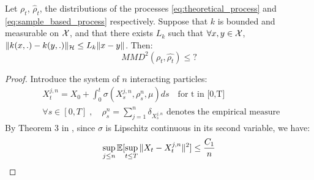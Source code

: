 \begin{proposition} Let $\rho_t$, $\widehat{\rho}_t$, the distributions of the processes \eqref{eq:theoretical_process} and \eqref{eq:sample_based_process} respectively. Suppose that $k$ is bounded and measurable on ${{\mathcal X}}$, and that there exists $L_k$ such that $\forall x,y \in {{\mathcal X}}$, $\| k(x,.)-k(y,.) \|_{{{\mathcal H}}}\le L_k \|x-y\|$. Then:
	\begin{equation}
	MMD^2(\rho_t,\widehat{\rho_t})\le ?%
	\end{equation}
\end{proposition}
\begin{proof}  
	Introduce the system of $n$ interacting particles:
	\begin{align}\label{eq:intermediary_process}
	&X_t^{j,n}=X_{0}+\int_{0}^t \sigma(X_s^{j,n}, \rho_s^n, \mu)ds \quad \text{for t in [0,T]}\\
	&\forall s \in [0,T]\;,\quad \rho_s^n=\sum_{j=1}^{n} \delta_{X_s^{j,n}} \text{ denotes the empirical measure } 
	\end{align}
	By Theorem 3 in \cite{jourdain2007nonlinear}, since $\sigma$ is Lipschitz continuous in its second variable, we have:	
	\begin{equation}\label{eq:upp_bound1}
	\sup_{j \le n}{{\mathbb E}}[\sup_{t\le T}\| X_t - X_t^{j,n}\|^2]\le \frac{C_1}{n}
	\end{equation}
	

\end{proof}
